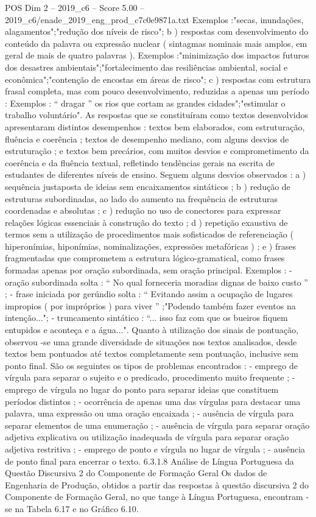 \begin{textsample}{POS Dim 2 – 2019\_c6 – Score 5.00 – 2019\_c6/enade\_2019\_eng\_prod\_c7c0e9871a.txt}
Exemplos :"secas, inundações, alagamentos";"redução dos níveis de risco"; b ) respostas com desenvolvimento do conteúdo da palavra ou expressão nuclear ( sintagmas nominais mais amplos, em geral de mais de quatro palavras ).
Exemplos :"minimização dos impactos futuros dos desastres ambientais";"fortalecimento das resiliências ambiental, social e econômica";"contenção de encostas em áreas de risco"; c ) respostas com estrutura frasal completa, mas com pouco desenvolvimento, reduzidas a apenas um período : Exemplos : “ dragar ” os rios que cortam as grandes cidades";"estimular o trabalho voluntário".
As respostas que se constituíram como textos desenvolvidos apresentaram distintos desempenhos : textos bem elaborados, com estruturação, fluência e coerência ; textos de desempenho mediano, com alguns desvios de estruturação ; e textos bem precários, com muitos desvios e comprometimento da coerência e da fluência textual, refletindo tendências gerais na escrita de estudantes de diferentes níveis de ensino.
Seguem alguns desvios observados : a ) sequência justaposta de ideias sem encaixamentos sintáticos ; b ) redução de estruturas subordinadas, ao lado do aumento na frequência de estruturas coordenadas e absolutas ; c ) redução no uso de conectores para expressar relações lógicas essenciais à construção do texto ; d ) repetição exaustiva de termos sem a utilização de procedimentos mais sofisticados de referenciação ( hiperonímias, hiponímias, nominalizações, expressões metafóricas ) ; e ) frases fragmentadas que comprometem a estrutura lógico-gramatical, como frases formadas apenas por oração subordinada, sem oração principal.
Exemplos : - oração subordinada solta : “ No qual forneceria moradias dignas de baixo custo ” ; - frase iniciada por gerúndio solta : “ Evitando assim a ocupação de lugares impropios ( por impróprios ) para viver ” ;"Podendo também fazer eventos na intenção..."; - truncamento sintático : “... isso faz com que os bueiros fiquem entupidos e aconteça e a água...".
Quanto à utilização dos sinais de pontuação, observou -se uma grande diversidade de situações nos textos analisados, desde textos bem pontuados até textos completamente sem pontuação, inclusive sem ponto final.
São os seguintes os tipos de problemas encontrados : - emprego de vírgula para separar o sujeito e o predicado, procedimento muito frequente ; - emprego de vírgula no lugar do ponto para separar ideias que constituem períodos distintos ; - ocorrência de apenas uma das vírgulas para destacar uma palavra, uma expressão ou uma oração encaixada ; - ausência de vírgula para separar elementos de uma enumeração ; - ausência de vírgula para separar oração adjetiva explicativa ou utilização inadequada de vírgula para separar oração adjetiva restritiva ; - emprego de ponto e vírgula no lugar de vírgula ; - ausência de ponto final para encerrar o texto. 6.3.1.8 Análise de Língua Portuguesa da Questão Discursiva 2 do Componente de Formação Geral Os dados de Engenharia de Produção, obtidos a partir das respostas à questão discursiva 2 do Componente de Formação Geral, no que tange à Língua Portuguesa, encontram -se na Tabela 6.17 e no Gráfico 6.10.

\end{textsample}

